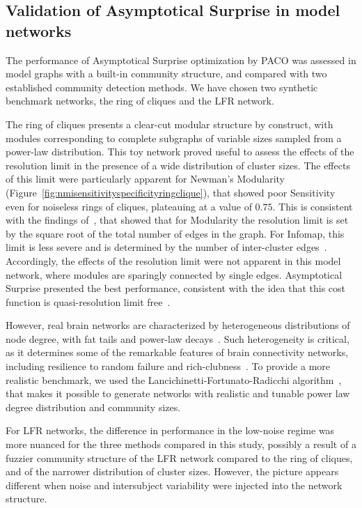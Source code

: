 \subsection{Validation of Asymptotical Surprise in model networks}
The performance of Asymptotical Surprise optimization by PACO was assessed in model graphs with a built-in community structure, and compared with two established community detection methods. We have chosen two synthetic benchmark networks, the ring of cliques and the LFR network.

The ring of cliques presents a clear-cut modular structure by construct, with modules corresponding to complete subgraphs of variable sizes sampled from a power-law distribution. 
This toy network proved useful to assess the effects of the resolution limit in the presence of a wide distribution of cluster sizes. The effects of this limit were particularly apparent for Newman's Modularity (Figure~\ref{fig:nmisensitivityspecificityringclique}), that showed poor Sensitivity even for noiseless rings of cliques, plateauing at a value of $0.75$.
This is consistent with the findings of~\cite{fortunato2007}, that showed that for Modularity the resolution limit is set by the square root of the total number of edges in the graph.
For Infomap, this limit is less severe and is determined by the number of inter-cluster edges~\cite{kawamoto2015}. Accordingly, the effects of the resolution limit were not apparent in this model network, where modules are sparingly connected by single edges.
Asymptotical Surprise presented the best performance, consistent with the idea that this cost function is quasi-resolution limit free~\cite{traag2015}.

However, real brain networks are characterized by heterogeneous distributions of node degree, with fat tails and power-law decays~\cite{bullmore2009}. Such heterogeneity is critical, as it determines some of the remarkable features of brain connectivity networks, including resilience to random failure and rich-clubness~\cite{vandenheuvel2011,vandenheuvel2013a}. To provide a more realistic benchmark, we used the Lancichinetti-Fortunato-Radicchi algorithm~\cite{lancichinetti2008}, that makes it possible to generate networks with realistic and tunable power law degree distribution and community sizes.

For LFR networks, the difference in performance in the low-noise regime was more nuanced for the three methods compared in this study, possibly a result of a fuzzier community structure of the LFR network compared to the ring of cliques, and of the narrower distribution of cluster sizes. However, the picture appears different when noise and intersubject variability were injected into the network structure.

